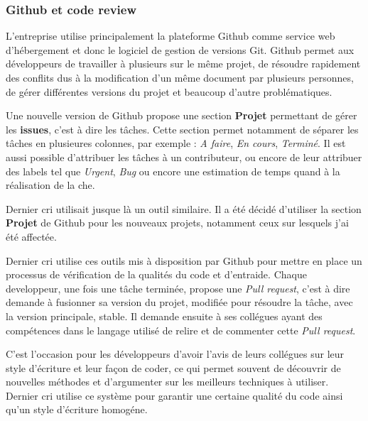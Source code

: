 \documentclass[12pt,a4paper]{article}
\begin{document}
  \subsubsection{Github et code review}\label{github-et-code-review}

  \bigskip

  L'entreprise utilise principalement la plateforme Github comme service
  web d'hébergement et donc le logiciel de gestion de versions Git. Github
  permet aux développeurs de travailler à plusieurs sur le même projet, de
  résoudre rapidement des conflits dus à la modification d'un même
  document par plusieurs personnes, de gérer différentes versions du
  projet et beaucoup d'autre problématiques.

  \bigskip

  Une nouvelle version de Github propose une section \textbf{Projet}
  permettant de gérer les \textbf{issues}, c'est à dire les tâches. Cette
  section permet notamment de séparer les tâches en plusieures colonnes,
  par exemple : \emph{A faire}, \emph{En cours}, \emph{Terminé}. Il est
  aussi possible d'attribuer les tâches à un contributeur, ou encore de
  leur attribuer des labels tel que \emph{Urgent}, \emph{Bug} ou encore
  une estimation de temps quand à la réalisation de la che.

  \bigskip

  Dernier cri utilisait jusque là un outil similaire. Il a été décidé
  d'utiliser la section \textbf{Projet} de Github pour les nouveaux
  projets, notamment ceux sur lesquels j'ai été affectée.

  \bigskip

  Dernier cri utilise ces outils mis à disposition par Github pour mettre
  en place un processus de vérification de la qualités du code et
  d'entraide. Chaque developpeur, une fois une tâche terminée, propose une
  \emph{Pull request}, c'est à dire demande à fusionner sa version du
  projet, modifiée pour résoudre la tâche, avec la version principale,
  stable. Il demande ensuite à ses collégues ayant des compétences dans le
  langage utilisé de relire et de commenter cette \emph{Pull request}.

  \bigskip

  C'est l'occasion pour les développeurs d'avoir l'avis de leurs collégues
  sur leur style d'écriture et leur façon de coder, ce qui permet souvent
  de découvrir de nouvelles méthodes et d'argumenter sur les meilleurs
  techniques à utiliser. Dernier cri utilise ce système pour garantir une
  certaine qualité du code ainsi qu'un style d'écriture homogéne.
\end{document}
